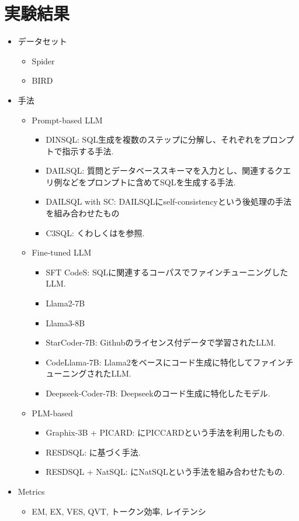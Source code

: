 \documentclass[dvipdfmx,uplatex]{jsarticle}
\theoremstyle{remark}
\newenvironment{experiment}[1]{
    \begin{tcolorbox}[
        colframe=violet,
        colback=violet!10!white,
        colbacktitle=violet!40!white,
        coltitle=black,
        fonttitle=\bfseries,
        title={#1}
    ]
}{
    \end{tcolorbox}
}
\begin{document}
\section{実験結果}
\begin{experiment}{実験手法}
\begin{itemize}
    \item データセット
    \begin{itemize}
        \item Spider
        \item BIRD
    \end{itemize}
    \item 手法
    \begin{itemize}
        \item Prompt-based LLM
        \begin{itemize}
            \item DINSQL: SQL生成を複数のステップに分解し、それぞれをプロンプトで指示する手法.
            \item DAILSQL: 質問とデータベーススキーマを入力とし、関連するクエリ例などをプロンプトに含めてSQLを生成する手法.
            \item DAILSQL with SC: DAILSQLにself-consistencyという後処理の手法を組み合わせたもの
            \item C3SQL: くわしくは\cite{c3_nl2sql}を参照.
        \end{itemize}
        \item Fine-tuned LLM
        \begin{itemize}
            \item SFT CodeS: SQLに関連するコーパスでファインチューニングしたLLM.
            \item Llama2-7B
            \item Llama3-8B 
            \item StarCoder-7B: Githubのライセンス付データで学習されたLLM.
            \item CodeLlama-7B: Llama2をベースにコード生成に特化してファインチューニングされたLLM.
            \item Deepseek-Coder-7B: Deepseekのコード生成に特化したモデル.
        \end{itemize}
        \item PLM-based
        \begin{itemize}
            \item Graphix-3B + PICARD: \cite{graphix_t5}にPICCARDという手法を利用したもの. 
            \item RESDSQL: \cite{resdsql}に基づく手法.
            \item RESDSQL + NatSQL: \cite{resdsql}にNatSQLという手法を組み合わせたもの.
        \end{itemize}
    \end{itemize}
    \item Metrics
    \begin{itemize}
        \item EM, EX, VES, QVT, トークン効率, レイテンシ
    \end{itemize}
\end{itemize}
\end{experiment}
\end{document}
